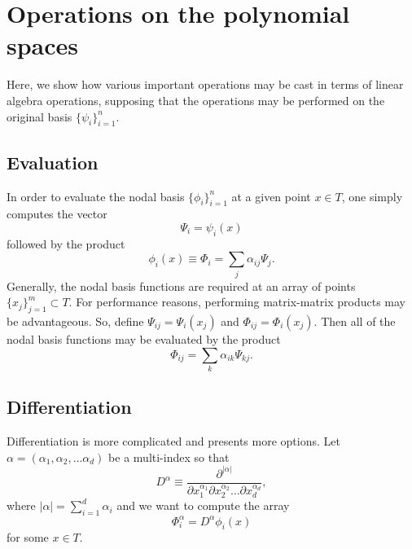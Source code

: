 \section{Operations on the polynomial spaces}
Here, we show how various important operations may be cast in terms of
linear algebra operations, supposing that the operations may be performed
on the original basis $\{ \psi_i \}_{i=1}^{n}$.

\subsection{Evaluation}
In order to evaluate the nodal basis $\{ \phi_i \}_{i=1}^{n}$ at a
given point $x \in T$, one simply computes the vector
\begin{equation}
\Psi_i = \psi_i(x)
\end{equation}
followed by the product
\begin{equation}
\phi_i(x) \equiv \Phi_i = \sum_j \alpha_{ij} \Psi_j.
\end{equation}
Generally, the nodal basis functions are required at an array of points
$\{ x_j \}_{j=1}^{m} \subset T$.  For performance reasons, performing
matrix-matrix products may be advantageous.  So, define $\Psi_{ij} =
\Psi_i(x_j)$ and $\Phi_{ij} = \Phi_i(x_j)$.  Then all of the nodal
basis functions may be evaluated by the product
\begin{equation}
\Phi_{ij} = \sum_k \alpha_{ik} \Psi_{kj}.
\end{equation}
\subsection{Differentiation}
Differentiation is more complicated and presents more options.
Let $\alpha = ( \alpha_1 , \alpha_2 , \dots \alpha_d )$ be a
multi-index so that
\begin{equation}
D^\alpha \equiv \frac{\partial^{|\alpha|}}{\partial
  x_1^{\alpha_1} \partial x_2^{\alpha_2} \dots \partial x_d^{\alpha_d}},
\end{equation}
where $|\alpha| = \sum_{i=1}^{d} \alpha_i$ and we want
to compute the array
\begin{equation}
\Phi^\alpha_i = D^\alpha \phi_i(x)
\end{equation}
for some $x \in T$.

